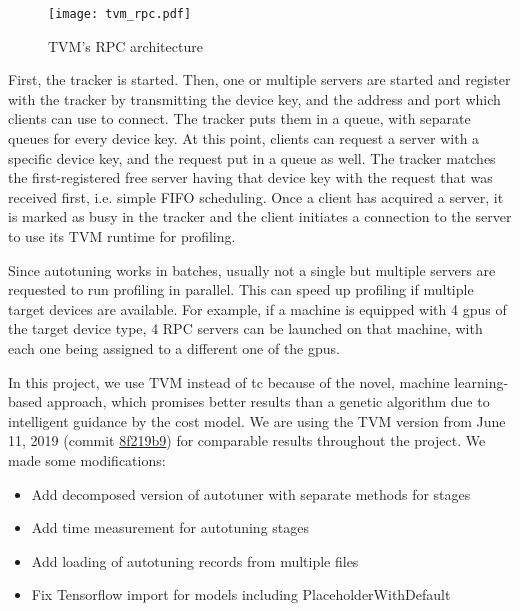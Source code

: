 \begin{figure}
	\centering
	\texttt{[image: tvm\_rpc.pdf]}%
	\caption{TVM's RPC architecture}
	\label{fig:tvm-rpc}
\end{figure}

First, the tracker is started. Then, one or multiple servers are started and register with the tracker by transmitting the device key, and the address and port which clients can use to connect. The tracker puts them in a queue, with separate queues for every device key. At this point, clients can request a server with a specific device key, and the request put in a queue as well. The tracker matches the first-registered free server having that device key with the request that was received first, i.e. simple FIFO scheduling. Once a client has acquired a server, it is marked as busy in the tracker and the client initiates a connection to the server to use its TVM runtime for profiling.

Since autotuning works in batches, usually not a single but multiple servers are requested to run profiling in parallel. This can speed up profiling if multiple target devices are available. For example, if a machine is equipped with 4 \glspl{gpu} of the target device type, 4 RPC servers can be launched on that machine, with each one being assigned to a different one of the \glspl{gpu}.

In this project, we use TVM instead of \gls{tc} because of the novel, machine learning-based approach, which promises better results than a genetic algorithm due to intelligent guidance by the cost model. We are using the TVM version from June 11, 2019 (commit \href{https://github.com/dmlc/tvm/tree/8f219b9}{8f219b9}) for comparable results throughout the project. We made some modifications:
\begin{itemize}
	\item Add decomposed version of autotuner with separate methods for stages
	\item Add time measurement for autotuning stages
	\item Add loading of autotuning records from multiple files
	\item Fix Tensorflow import for models including PlaceholderWithDefault
\end{itemize}
